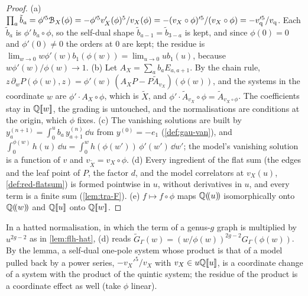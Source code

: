 \begin{proof}
(a) $\prod_a\tilde b_a=\phi'^5\mathcal{B}_X(\phi)=-\phi'^5v_X'(\phi)^5/v_X(\phi)=-(v_X\circ\phi)'^5/(v_X\circ\phi)=-v_{\mathrm q}'^5/v_{\mathrm q}$. Each $\tilde b_a$ is $\phi'\,b_a\circ\phi$, so the self-dual shape $\tilde b_{a-1}=\tilde b_{3-a}$ is kept, and since $\phi(0)=0$ and $\phi'(0)\neq0$ the orders at $0$ are kept; the residue is $\lim_{w\to0}w\phi'(w)b_1(\phi(w))=\lim_{u\to0}ub_1(u)$, because $w\phi'(w)/\phi(w)\to1$. (b) Let $A_X=\sum_ab_aE_{a,a+1}$. By the chain rule, $z\,\partial_wP(\phi(w),z)=\phi'(w)\,(A_XP-P\tilde A_{v_X})(\phi(w))$, and the systems in the coordinate $w$ are $\phi'\cdot A_X\circ\phi$, which is $\tilde X$, and $\phi'\cdot\tilde A_{v_X}\circ\phi=\tilde A_{v_X\circ\phi}$. The coefficients stay in $\mathbb{Q}[\![ w ]\!]$, the grading is untouched, and the normalisations are conditions at the origin, which $\phi$ fixes. (c) The vanishing solutions are built by $y^{(n+1)}_a=\int_0^ub_a\,y^{(n)}_{a+1}\,\dd u$ from $y^{(0)}=-e_1$ (\cref{def:gau-van}), and $\int_0^{\phi(w)}h(u)\,\dd u=\int_0^wh(\phi(w'))\,\phi'(w')\,\dd w'$; the model's vanishing solution is a function of $v$ and $v_{\tilde X}=v_X\circ\phi$. (d) Every ingredient of the flat sum (the edges and the leaf point of $P$, the factor $d$, and the model correlators at $v_X(u)$, \cref{def:red-flatsum}) is formed pointwise in $u$, without derivatives in $u$, and every term is a finite sum (\cref{lem:tra-F}). (e) $f\mapsto f\circ\phi$ maps $\mathbb{Q}(\!(u)\!)$ isomorphically onto $\mathbb{Q}(\!(w)\!)$ and $\mathbb{Q}[\![ u ]\!]$ onto $\mathbb{Q}[\![ w ]\!]$.
\end{proof}

In a hatted normalisation, in which the term of a genus-$g$ graph is multiplied by $u^{2g-2}$ as in \cref{lem:flh-hat}, (d) reads $\tilde G_\Gamma(w)=(w/\phi(w))^{2g-2}G_\Gamma(\phi(w))$. By the lemma, a self-dual one-pole system whose product is that of a model pulled back by a power series, $-v_X'^5/v_X$ with $v_X\in u\mathbb{Q}[\![ u ]\!]$, is a coordinate change of a system with the product of the quintic system; the residue of the product is a coordinate effect as well (take $\phi$ linear).


